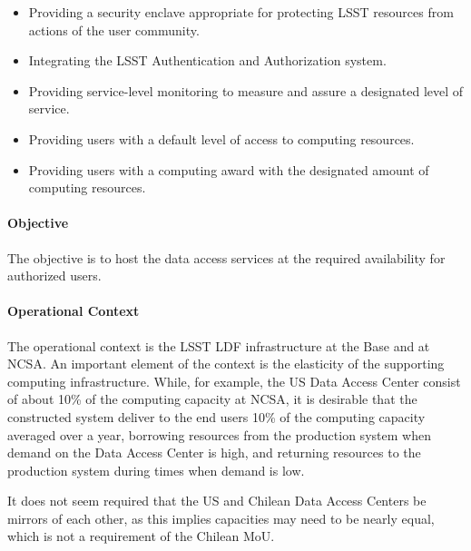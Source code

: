 \begin{itemize}
\item Providing a security enclave appropriate for protecting LSST resources from actions of the user community.

\item Integrating the LSST Authentication and Authorization system.

\item Providing service-level monitoring to measure and assure a designated level of service.

\item Providing users with a default level of access to computing resources.

\item Providing users with a computing award with the designated amount of computing resources.

\end{itemize}

\paragraph{Objective}

The objective is to host the data access services at the required availability for authorized users.

\paragraph{Operational Context}

The operational context is the LSST LDF infrastructure at the Base and at NCSA. An important element of the context is the elasticity of the supporting computing infrastructure. While, for example, the US Data Access Center consist of about 10\% of the computing capacity at NCSA, it is desirable that the constructed system deliver to the end users 10\% of the computing capacity averaged over a year, borrowing resources from the production system when demand on the Data Access Center is high, and returning resources to the production system during times when demand is low.

It does not seem required that the US and Chilean Data Access Centers be mirrors of each other, as this implies capacities may need to be nearly equal, which is not a requirement of the Chilean MoU.

